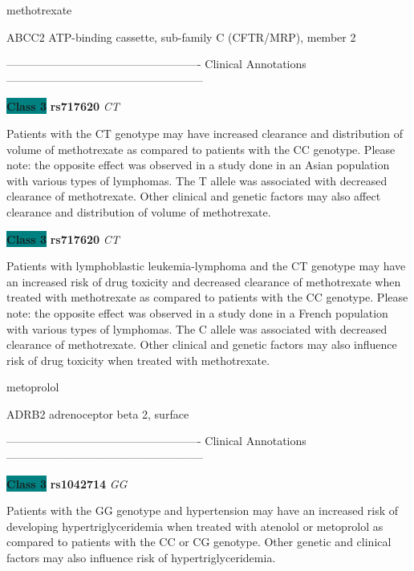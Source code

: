 \documentclass{resume} %
\begin{document}
\begin{rSection}{ methotrexate }
\begin{rSubsection}{ ABCC2 }{ ATP-binding cassette, sub-family C (CFTR/MRP), member 2 }{}{}
\item[] ---------------------------------------------------- Clinical Annotations -----------------------------------------------------\newline
\item \textbf{\colorbox{teal} {Class 3}} \textbf{ rs717620 } \textit{ CT }
\item[] Patients with the CT genotype may have increased clearance and distribution of volume of methotrexate as compared to patients with the CC genotype. Please note: the opposite effect was observed in a study done in an Asian population with various types of lymphomas. The T allele was associated with decreased clearance of methotrexate. Other clinical and genetic factors may also affect clearance and distribution of volume of methotrexate. \item \textbf{\colorbox{teal} {Class 3}} \textbf{ rs717620 } \textit{ CT }
\item[] Patients with lymphoblastic leukemia-lymphoma and the CT genotype may have an increased risk of drug toxicity and decreased clearance of methotrexate when treated with methotrexate as compared to patients with the CC genotype. Please note: the opposite effect was observed in a study done in a French population with various types of lymphomas. The C allele was associated with decreased clearance of methotrexate. Other clinical and genetic factors may also influence risk of drug toxicity when treated with methotrexate. 
\end{rSubsection}

\end{rSection}\begin{rSection}{ metoprolol }
\item[]

\begin{rSubsection}{ ADRB2 }{ adrenoceptor beta 2, surface }{}{}
\item[]

\item[] ---------------------------------------------------- Clinical Annotations -----------------------------------------------------\newline
\item \textbf{\colorbox{teal} {Class 3}} \textbf{ rs1042714 } \textit{ GG }
\item[] Patients with the GG genotype and hypertension may have an increased risk of developing hypertriglyceridemia when treated with atenolol or metoprolol as compared to patients with the CC or CG genotype. Other genetic and clinical factors may also influence risk of hypertriglyceridemia. 
\end{rSubsection}


\end{rSection}
\end{document}
